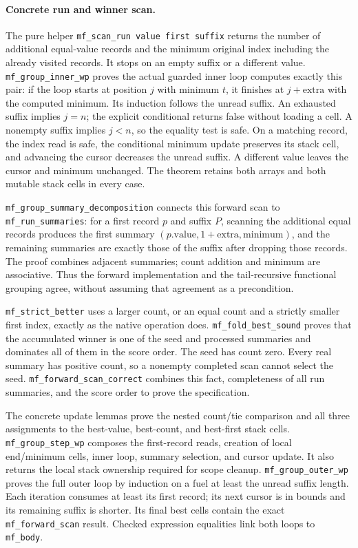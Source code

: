 \paragraph{Concrete run and winner scan.}
The pure helper \texttt{mf\_scan\_run value first suffix} returns the
number of additional equal-value records and the minimum original index
including the already visited records. It stops on an empty suffix or a
different value. \texttt{mf\_group\_inner\_wp} proves the actual guarded
inner loop computes exactly this pair: if the loop starts at position
$j$ with minimum $t$, it finishes at $j+\mathrm{extra}$ with the computed
minimum. Its induction follows the unread suffix. An exhausted suffix
implies $j=n$; the explicit conditional returns false without loading a
cell. A nonempty suffix implies $j<n$, so the equality test is safe.
On a matching record, the index read is safe, the conditional minimum
update preserves its stack cell, and advancing the cursor decreases the
unread suffix. A different value leaves the cursor and minimum unchanged.
The theorem retains both arrays and both mutable stack cells in every case.

\texttt{mf\_group\_summary\_decomposition} connects this forward scan
to \texttt{mf\_run\_summaries}: for a first record $p$ and suffix $P$,
scanning the additional equal records produces the first summary
$(p.\mathrm{value},1+\mathrm{extra},\mathrm{minimum})$, and the remaining
summaries are exactly those of the suffix after dropping those records.
The proof combines adjacent summaries; count addition and minimum are
associative. Thus the forward implementation and the tail-recursive
functional grouping agree, without assuming that agreement as a precondition.

\texttt{mf\_strict\_better} uses a larger count, or an equal count and a
strictly smaller first index, exactly as the native operation does.
\texttt{mf\_fold\_best\_sound} proves that the accumulated winner is one
of the seed and processed summaries and dominates all of them in the
score order. The seed has count zero. Every real summary has positive
count, so a nonempty completed scan cannot select the seed.
\texttt{mf\_forward\_scan\_correct} combines this fact, completeness of
all run summaries, and the score order to prove the specification.

The concrete update lemmas prove the nested count/tie comparison and all
three assignments to the best-value, best-count, and best-first stack cells.
\texttt{mf\_group\_step\_wp} composes the first-record reads, creation of
local end/minimum cells, inner loop, summary selection, and cursor update.
It also returns the local stack ownership required for scope cleanup.
\texttt{mf\_group\_outer\_wp} proves the full outer loop by induction
on a fuel at least the unread suffix length. Each iteration consumes at
least its first record; its next cursor is in bounds and its remaining
suffix is shorter. Its final best cells contain the exact
\texttt{mf\_forward\_scan} result. Checked expression equalities link
both loops to \texttt{mf\_body}.

